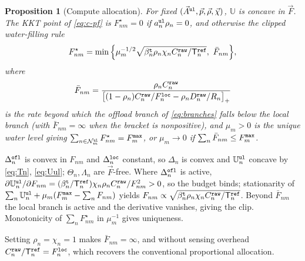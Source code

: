 \documentclass[journal]{IEEEtran}
\newtheorem{proposition}{Proposition}
\begin{document}
\begin{proposition}[Compute allocation]\label{prop:F}
For fixed $(\vec{A}^{\tt ul},\vec{p},\vec{\rho},\vec{\chi})$, $\mathbb{U}$ is concave in $\vec{F}$. The KKT point of \eqref{eq:c-pf} is $F_{nm}^\star=0$ if $a_n^{\tt ul}\rho_n=0$, and otherwise the clipped water-filling rule
\begin{equation}
F_{nm}^\star
=\min\Big\{\mu_m^{-1/2}\sqrt{\beta_n^{\tt t}\rho_n\chi_n C_n^{\tt raw}/\mathsf{T}_n^{\tt ref}},\ \bar F_{nm}\Big\},
\label{eq:Fstar}
\end{equation}
where
\begin{equation}
\bar F_{nm}
=\frac{\rho_n C_n^{\tt raw}}
{\big[(1-\rho_n)C_n^{\tt raw}/F_n^{\tt loc}-\rho_n D_n^{\tt raw}/R_n\big]_+}
\label{eq:Fbar}
\end{equation}
is the rate beyond which the offload branch of \eqref{eq:branches} falls below the local branch (with $\bar F_{nm}=\infty$ when the bracket is nonpositive), and $\mu_m>0$ is the unique water level giving $\sum_{n\in\mathcal{N}_m^{\tt ul}}F_{nm}^\star=F_m^{\tt max}$, or $\mu_m\to0$ if $\sum_n\bar F_{nm}\le F_m^{\tt max}$.
\end{proposition}
\begin{IEEEproof}
$\Delta_n^{\tt ofl}$ is convex in $F_{nm}$ and $\Delta_n^{\tt loc}$ constant, so $\Delta_n$ is convex and $\mathbb{U}_n^{\tt ul}$ concave by \eqref{eq:Tn}, \eqref{eq:Uul}; $\Theta_n,\Lambda_n$ are $\vec{F}$-free. Where $\Delta_n^{\tt ofl}$ is active, $\partial\mathbb{U}_n^{\tt ul}/\partial F_{nm}=(\beta_n^{\tt t}/\mathsf{T}_n^{\tt ref})\chi_n\rho_n C_n^{\tt raw}/F_{nm}^2>0$, so the budget binds; stationarity of $\sum_n\mathbb{U}_n^{\tt ul}+\mu_m(F_m^{\tt max}-\sum_n F_{nm})$ yields $F_{nm}\propto\sqrt{\beta_n^{\tt t}\rho_n\chi_n C_n^{\tt raw}/\mathsf{T}_n^{\tt ref}}$. Beyond $\bar F_{nm}$ the local branch is active and the derivative vanishes, giving the clip. Monotonicity of $\sum_n F_{nm}^\star$ in $\mu_m^{-1}$ gives uniqueness.
\end{IEEEproof}
Setting $\rho_n=\chi_n=1$ makes $\bar F_{nm}=\infty$, and without sensing overhead $C_n^{\tt raw}/\mathsf{T}_n^{\tt ref}=F_n^{\tt loc}$, which recovers the conventional proportional allocation.
\end{document}
